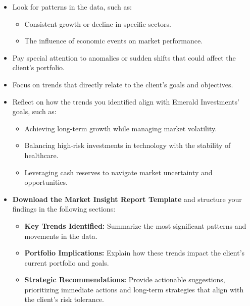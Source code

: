 \documentclass[11pt]{article}
\begin{document}
\begin{itemize}[leftmargin=1.5em, itemsep=2pt]
  \item Look for patterns in the data, such as:
  \begin{itemize}[itemsep=1pt]
    \item Consistent growth or decline in specific sectors.
    \item The influence of economic events on market performance.
  \end{itemize}
  \item Pay special attention to anomalies or sudden shifts that could affect
  the client's portfolio.
  \item Focus on trends that directly relate to the client's goals and
  objectives.
\end{itemize}

\begin{itemize}[leftmargin=1.5em, itemsep=2pt]
  \item Reflect on how the trends you identified align with Emerald
  Investments' goals, such as:
  \begin{itemize}[itemsep=1pt]
    \item Achieving long-term growth while managing market volatility.
    \item Balancing high-risk investments in technology with the stability of
    healthcare.
    \item Leveraging cash reserves to navigate market uncertainty and
    opportunities.
  \end{itemize}
\end{itemize}

\begin{itemize}[leftmargin=1.5em, itemsep=2pt]
  \item \textbf{Download the Market Insight Report Template} and structure
  your findings in the following sections:
  \begin{itemize}[itemsep=1pt]
    \item \textbf{Key Trends Identified:} Summarize the most significant
    patterns and movements in the data.
    \item \textbf{Portfolio Implications:} Explain how these trends impact the
    client's current portfolio and goals.
    \item \textbf{Strategic Recommendations:} Provide actionable suggestions,
    prioritizing immediate actions and long-term strategies that align with
    the client's risk tolerance.
  \end{itemize}
\end{itemize}
\end{document}
